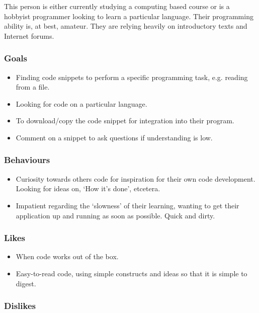 \documentclass[11pt,a4paper]{article}
\begin{document}
This person is either currently studying a computing based course or is a
hobbyist programmer looking to learn a particular language. Their programming
ability is, at best, amateur. They are relying heavily on introductory texts
and Internet forums.

\subsubsection{Goals}

\begin{itemize}
\item Finding code snippets to perform a specific programming task,
e.g. reading from a file.
\item Looking for code on a particular language.
\item To download/copy the code snippet for integration into their
program.
\item Comment on a snippet to ask questions if understanding is low.
\end{itemize}

\subsubsection{Behaviours}

\begin{itemize}
\item Curiosity towards others code for inspiration for their own code
development. Looking for ideas on, `How it's done', etcetera.
\item Impatient regarding the `slowness' of their learning, wanting to
get their application up and running as soon as possible. Quick and
dirty.
\end{itemize}

\subsubsection{Likes}

\begin{itemize}
\item When code works out of the box.
\item Easy-to-read code, using simple constructs and ideas so that it
is simple to digest.
\end{itemize}

\subsubsection{Dislikes}
\end{document}
